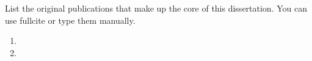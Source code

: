 
List the original publications that make up the core of this dissertation. You can use fullcite or type them manually.

\begin{enumerate}
    \item {}
    \item {}
\end{enumerate}